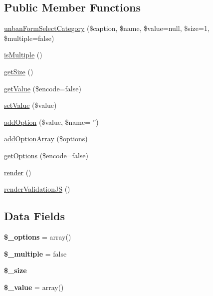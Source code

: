 \subsection*{Public Member Functions}
\begin{DoxyCompactItemize}
\item 
\hyperlink{classunban_form_select_category_a74d83de33fd46dcff08a1496951e977a}{unban\-Form\-Select\-Category} (\$caption, \$name, \$value=null, \$size=1, \$multiple=false)
\item 
\hyperlink{classunban_form_select_category_ac5d76ccb2e931e4abb4456d6ad492ac1}{is\-Multiple} ()
\item 
\hyperlink{classunban_form_select_category_a75cce10cdf81be6dc84881c28b3379b7}{get\-Size} ()
\item 
\hyperlink{classunban_form_select_category_ab3c79e314dfd09da4de90fb2ce5eaa9d}{get\-Value} (\$encode=false)
\item 
\hyperlink{classunban_form_select_category_a7494441b6ed08a391704971873f31432}{set\-Value} (\$value)
\item 
\hyperlink{classunban_form_select_category_ac485d7f4f2160de8fb47aa29aeed7080}{add\-Option} (\$value, \$name= '')
\item 
\hyperlink{classunban_form_select_category_a673ec8d6dc3cc0ee2f62fbe1c824ccc5}{add\-Option\-Array} (\$options)
\item 
\hyperlink{classunban_form_select_category_ac15eda2814c8ff0477244b28a315fb5a}{get\-Options} (\$encode=false)
\item 
\hyperlink{classunban_form_select_category_afde88292c44dc59faf017738dae6dffb}{render} ()
\item 
\hyperlink{classunban_form_select_category_a2747262e7fc6aba84bfc52bcf38407df}{render\-Validation\-J\-S} ()
\end{DoxyCompactItemize}
\subsection*{Data Fields}
\begin{DoxyCompactItemize}
\item 
\hypertarget{classunban_form_select_category_a1bebdc689c84eee59ad24c77e5531762}{{\bfseries \$\-\_\-options} = array()}\label{classunban_form_select_category_a1bebdc689c84eee59ad24c77e5531762}

\item 
\hypertarget{classunban_form_select_category_acae132bb5063b7d542ea6a0be0ae22f2}{{\bfseries \$\-\_\-multiple} = false}\label{classunban_form_select_category_acae132bb5063b7d542ea6a0be0ae22f2}

\item 
\hypertarget{classunban_form_select_category_a3f3a27f0a14f4760227dbc5ae3288681}{{\bfseries \$\-\_\-size}}\label{classunban_form_select_category_a3f3a27f0a14f4760227dbc5ae3288681}

\item 
\hypertarget{classunban_form_select_category_a599c02a4727030b8ecc632f7c8adafeb}{{\bfseries \$\-\_\-value} = array()}\label{classunban_form_select_category_a599c02a4727030b8ecc632f7c8adafeb}

\end{DoxyCompactItemize}


